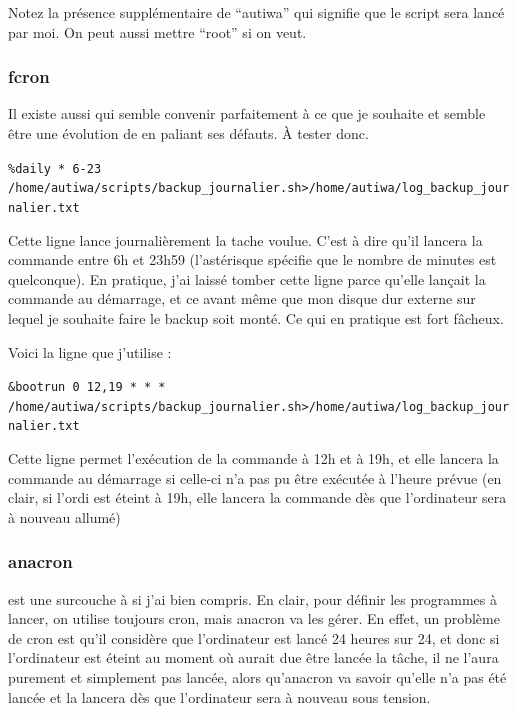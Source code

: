 \documentclass[a4paper,twoside]{article}
\begin{document}
\begin{remarque}
Notez la présence supplémentaire de ``autiwa'' qui signifie que le script sera lancé par moi. On peut aussi mettre ``root'' si on veut.
\end{remarque}



\subsubsection{fcron}

Il existe aussi  qui semble convenir parfaitement à ce que je souhaite et semble être une évolution de  en paliant ses défauts. À tester donc.

\begin{footnotesize}\verb|%daily * 6-23 /home/autiwa/scripts/backup_journalier.sh>/home/autiwa/log_backup_journalier.txt|\end{footnotesize}


Cette ligne lance journalièrement la tache voulue. C'est à dire qu'il lancera la commande entre 6h et 23h59 (l'astérisque spécifie que le nombre de minutes est quelconque). En pratique, j'ai laissé tomber cette ligne parce qu'elle lançait la commande au démarrage, et ce avant même que mon disque dur externe sur lequel je souhaite faire le backup soit monté. Ce qui en pratique est fort fâcheux.

Voici la ligne que j'utilise :

\begin{footnotesize}\verb|&bootrun 0 12,19 * * * /home/autiwa/scripts/backup_journalier.sh>/home/autiwa/log_backup_journalier.txt|\end{footnotesize}

Cette ligne permet l'exécution de la commande à 12h et à 19h, et elle lancera la commande au démarrage si celle-ci n'a pas pu être exécutée à l'heure prévue (en clair, si l'ordi est éteint à 19h, elle lancera la commande dès que l'ordinateur sera à nouveau allumé)


\subsubsection{anacron}
 est une surcouche à  si j'ai bien compris. En clair, pour définir les programmes à lancer, on utilise toujours cron, mais anacron va les gérer. En effet, un problème de cron est qu'il considère que l'ordinateur est lancé 24 heures sur 24, et donc si l'ordinateur est éteint au moment où aurait due être lancée la tâche, il ne l'aura purement et simplement pas lancée, alors qu'anacron va savoir qu'elle n'a pas été lancée et la lancera dès que l'ordinateur sera à nouveau sous tension.
\end{document}
